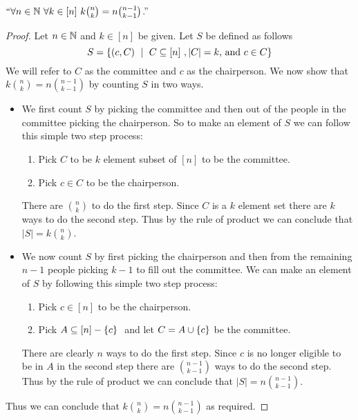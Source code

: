         \begin{theorem}
            $``\forall n \in \mathbb{N} \ \forall k \in [n] \ k \binom{n}{k} = n \binom{n - 1}{k - 1}$.''
        \end{theorem}
        \begin{proof}
            Let $n \in \mathbb{N}$ and $k \in [n]$ be given. Let $S$ be defined as follows
            \begin{equation}
                S = \Set{(c, C) \ \mid \ \subs{C}{[n]}, |C| = k \mbox{, and } c \in C}
            \end{equation}
            We will refer to $C$ as the committee and $c$ as the chairperson.
            We now show that $k \binom{n}{k} = n \binom{n - 1}{k - 1}$ by counting $S$ in
            two ways.
            \begin{itemize}
                \item
                    We first count $S$ by picking the committee and then out of the people
                    in the committee picking the chairperson. So to make an element of $S$
                    we can follow this simple two step process:
                    \begin{enumerate}
                        \item
                            Pick $C$ to be $k$ element subset of $[n]$ to be the committee.
                        \item
                            Pick $c \in C$ to be the chairperson.
                    \end{enumerate}
                    There are $\binom{n}{k}$ to do the first step. Since $C$ is a $k$
                    element set there are $k$ ways to do the second step. Thus by the
                    rule of product we can conclude that $|S| = k \binom{n}{k}$.
                \item
                    We now count $S$ by first picking the chairperson and then from the
                    remaining $n - 1$ people picking $k - 1$ to fill out the committee. 
                    We can make an element of $S$ by following this simple two step process:
                    \begin{enumerate}
                        \item
                            Pick $c \in [n]$ to be the chairperson.
                        \item
                            Pick $A \subseteq [n] - \left\{c\right\} \ $ and let $C = A \cup \left\{c\right\}$
                            be the committee.
                    \end{enumerate}
                        There are clearly $n$ ways to do the first step. Since $c$ is no
                        longer eligible to be in $A$ in the second step there are $\binom{n - 1}{k - 1}$
                        ways to do the second step. Thus by the rule of product we can conclude
                        that $|S| = n \binom{n - 1}{k - 1}$.
            \end{itemize}
            Thus we can conclude that $k \binom{n}{k} = n \binom{n - 1}{k - 1}$
            as required. \QED
        \end{proof}
